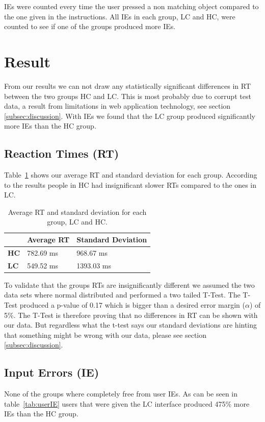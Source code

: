 \documentclass[runningheads,a4paper]{llncs}
\begin{document}
IEs were counted every time the user pressed a non matching object compared to the one given in the instructions. All IEs in each group, LC and HC, were counted to see if one of the groups produced more IEs.

\section{Result}
From our results we can not draw any statistically significant differences in RT between the two groups HC and LC. This is most probably due to corrupt test data, a result from limitations in web application technology, see section \ref{subsec:discussion}. With IEs we found that the LC group produced significantly more IEs than the HC group.

\subsection{Reaction Times (RT)}
Table~\ref{tab:groupRT} shows our average RT and standard deviation for each group. According to the results people in HC had insignificant slower RTs compared to the ones in LC.

\begin{table}[]
	\centering
	\label{tab:groupRT}
	\setlength{\tabcolsep}{1em}
	\setlength\extrarowheight{1em}
	\begin{tabular}{l|l|l}
		\textbf{} & \textbf{Average RT} & \textbf{Standard Deviation} \\ \hline
		\textbf{HC} & 782.69 ms & 968.67 ms \\ \hline
		\textbf{LC} & 549.52 ms & 1393.03 ms
	\end{tabular}
	\caption{Average RT and standard deviation for each group, LC and HC.}
\end{table}

To validate that the groups RTs are insignificantly different we assumed the two data sets where normal distributed and performed a two tailed T-Test. The T-Test produced a p-value of 0.17 which is bigger than a desired error margin ($\alpha$) of 5\%. The T-Test is therefore proving that no differences in RT can be shown with our data. But regardless what the t-test says our standard deviations are hinting that something might be wrong with our data, please see section \ref{subsec:discussion}.

\subsection{Input Errors (IE)}
None of the groups where completely free from user IEs. As can be seen in table~\ref{tab:userIE} users that were given the LC interface produced 475\% more IEs than the HC group.
\end{document}
